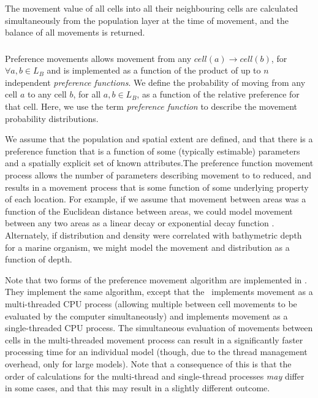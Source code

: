 The movement value of all cells into all their neighbouring cells are calculated simultaneously from the population layer at the time of movement, and the balance of all movements is returned.

\subsubsection{}

Preference movements allows movement from any $cell(a) \rightarrow cell(b)$, for $\forall a,b \in L_B$ and is implemented as a function of the product of up to $n$ independent \emph{preference functions}. We define the probability of moving from any cell $a$ to any cell $b$, for all $a,b \in L_B$, as a function of the relative preference for that cell. Here, we use the term \emph{preference function} \citep{1366,1367} to describe the movement probability distributions. 

We assume that the population and spatial extent are defined, and that there is a preference function that is a function of some (typically estimable) parameters and a spatially explicit set of known attributes.The preference function movement process allows the number of parameters describing movement to to reduced, and results in a movement process that is some function of some underlying property of each location. For example, if we assume that movement between areas was a function of the Euclidean distance between areas, we could model movement between any two areas as a linear decay or exponential decay function \citep{1366}. Alternately, if distribution and density were correlated with bathymetric depth for a marine organism, we might model the movement and distribution as a function of depth. 

Note that two forms of the preference movement algorithm are implemented in \SPM. They implement the same algorithm, except that the \ implements movement as a multi-threaded CPU process (allowing multiple between cell movements to be evaluated by the computer simultaneously) and  implements movement as a single-threaded CPU process. The simultaneous evaluation of movements between cells in the multi-threaded movement process can result in a significantly faster processing time for an individual model (though, due to the thread management overhead, only for large models). Note that a consequence of this is that the order of calculations for the multi-thread and single-thread processes \emph{may} differ in some cases, and that this may result in a slightly different outcome.


